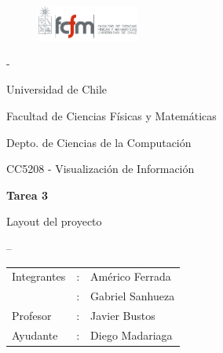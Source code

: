 \documentclass[letterpaper,10pt]{article}
\begin{document}
	\begin{titlepage}

		\begin{figure}
			\includegraphics[width=0.3\textwidth]{logoFCFM.png}
		\end{figure}

		\noindent \phantom - %

		Universidad de Chile

		Facultad de Ciencias Físicas y Matemáticas

		Depto. de Ciencias de la Computación

		CC5208 - Visualización de Información

		\vfill

		\begin{center}
			\begin{Huge}
				{\textbf{Tarea 3}}
			\end{Huge}

			\begin{large}
				Layout del proyecto
			\end{large}

		\end{center}
--
		\vfill

		\begin{flushright}
			\begin{tabular}{lll}
				Integrantes	&:	& Américo Ferrada\\
						&:	& Gabriel Sanhueza\\
				Profesor	&:	& Javier Bustos\\
				Ayudante	&:	& Diego Madariaga\\
			\end{tabular}
		\end{flushright}

	\end{titlepage}

	\newpage
\end{document}

